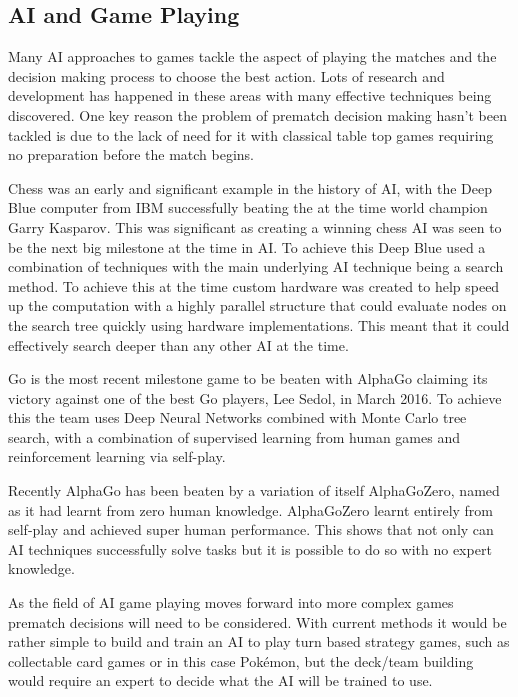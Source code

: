 \documentclass[a4paper]{article}
\newcommand{\Pokemon}{Pok\'{e}mon}
\begin{document}
\subsection{AI and Game Playing}
Many AI approaches to games tackle the aspect of playing the matches and the decision making process to choose the best action.
Lots of research and development has happened in these areas with many effective techniques being discovered.
One key reason the problem of prematch decision making hasn't been tackled is due to the lack of need for it with classical table top games requiring no preparation before the match begins.
\\ \par
Chess was an early and significant example in the history of AI, with the Deep Blue computer from IBM successfully beating the at the time world champion Garry Kasparov\cite{deepBlue}.
This was significant as creating a winning chess AI was seen to be the next big milestone at the time in AI\@.
To achieve this Deep Blue used a combination of techniques with the main underlying AI technique being a search method.
To achieve this at the time custom hardware was created to help speed up the computation with a highly parallel structure that could evaluate nodes on the search tree quickly using hardware implementations.
This meant that it could effectively search deeper than any other AI at the time.
\par
Go is the most recent milestone game to be beaten with AlphaGo claiming its victory against one of the best Go players, Lee Sedol, in March 2016\cite{alphaGo}.
To achieve this the team uses Deep Neural Networks combined with Monte Carlo tree search, with a combination of supervised learning from human games and reinforcement learning via self-play.
\par
Recently AlphaGo has been beaten by a variation of itself AlphaGoZero, named as it had learnt from zero human knowledge\cite{alphaGoZero}.
AlphaGoZero learnt entirely from self-play and achieved super human performance.
This shows that not only can AI techniques successfully solve tasks but it is possible to do so with no expert knowledge.
\\ \par
As the field of AI game playing moves forward into more complex games prematch decisions will need to be considered.
With current methods it would be rather simple to build and train an AI to play turn based strategy games, such as collectable card games or in this case \Pokemon{}, but the deck/team building would require an expert to decide what the AI will be trained to use.
\end{document}
